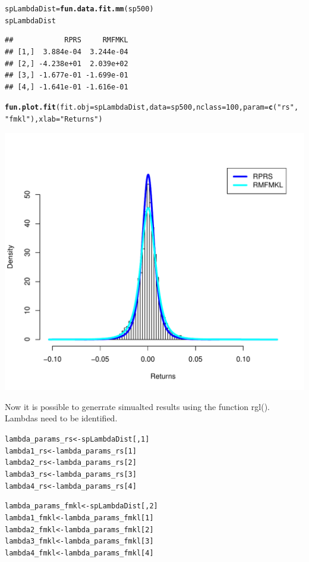 \documentclass[12pt, a4paper, oneside]{article}\usepackage[]{graphicx}\usepackage[]{color}
\makeatletter
\def\maxwidth{ %
  \ifdim\Gin@nat@width>\linewidth
    \linewidth
  \else
    \Gin@nat@width
  \fi
}
\newcommand{\hlstr}[1]{\textcolor[rgb]{0.192,0.494,0.8}{#1}}%
\newcommand{\hlkwd}[1]{\textcolor[rgb]{0.737,0.353,0.396}{\textbf{#1}}}%
\newenvironment{kframe}{%
 \def\at@end@of@kframe{}%
 \ifinner\ifhmode%
  \def\at@end@of@kframe{\end{minipage}}%
  \begin{minipage}{\columnwidth}%
 \fi\fi%
 \def\FrameCommand##1{\hskip\@totalleftmargin \hskip-\fboxsep
 \colorbox{shadecolor}{##1}\hskip-\fboxsep
     \hskip-\linewidth \hskip-\@totalleftmargin \hskip\columnwidth}%
 \MakeFramed {\advance\hsize-\width
   \@totalleftmargin\z@ \linewidth\hsize
   \@setminipage}}%
 {\par\unskip\endMakeFramed%
 \at@end@of@kframe}
\newenvironment{knitrout}{}{} %
\makeatother
\begin{document}
\begin{knitrout}
\color{fgcolor}\begin{kframe}
\begin{alltt}
spLambdaDist = \hlkwd{fun.data.fit.mm}(sp500)
spLambdaDist
\end{alltt}
\begin{verbatim}
##            RPRS     RMFMKL
## [1,]  3.884e-04  3.244e-04
## [2,] -4.238e+01  2.039e+02
## [3,] -1.677e-01 -1.699e-01
## [4,] -1.641e-01 -1.616e-01
\end{verbatim}
\begin{alltt}
\hlkwd{fun.plot.fit}(fit.obj = spLambdaDist, data = sp500, nclass = 100, param = \hlkwd{c}(\hlstr{"rs"}, 
    \hlstr{"fmkl"}), xlab = \hlstr{"Returns"})
\end{alltt}
\end{kframe}
\includegraphics[width=\maxwidth]{figure/GLD} 

\end{knitrout}

Now it is possible to generrate simualted results using the function rgl(). Lambdas need to be identified. 
\begin{knitrout}
\color{fgcolor}\begin{kframe}
\begin{alltt}
lambda_params_rs <- spLambdaDist[, 1]
lambda1_rs <- lambda_params_rs[1]
lambda2_rs <- lambda_params_rs[2]
lambda3_rs <- lambda_params_rs[3]
lambda4_rs <- lambda_params_rs[4]

lambda_params_fmkl <- spLambdaDist[, 2]
lambda1_fmkl <- lambda_params_fmkl[1]
lambda2_fmkl <- lambda_params_fmkl[2]
lambda3_fmkl <- lambda_params_fmkl[3]
lambda4_fmkl <- lambda_params_fmkl[4]
\end{alltt}
\end{kframe}
\end{knitrout}
\end{document}

